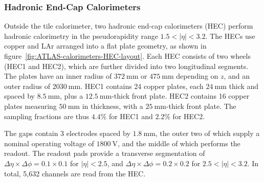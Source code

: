 \subsubsection{Hadronic End-Cap Calorimeters}\label{sec:ATLAS-calorimeters-HEC}
Outside the tile calorimeter, two hadronic end-cap calorimeters (HEC) perform hadronic calorimetry in the pseudorapidity range $1.5<|\eta|<3.2$. The HECs use copper and LAr arranged into a flat plate geometry, as shown in figure~\ref{fig:ATLAS-calorimeters-HEC-layout}. Each HEC consists of two wheels (HEC1 and HEC2), which are further divided into two longitudinal segments.  The plates have an inner radius of $\SI{372}{\milli\meter}$ or $\SI{475}{\milli\meter}$ depending on $z$, and an outer radius of $\SI{2030}{\milli\meter}$. HEC1 contains 24 copper plates, each $\SI{24}{\milli\meter}$ thick and spaced by $\SI{8.5}{\milli\meter}$, plus a $\SI{12.5}{\milli\meter}$-thick front plate. HEC2 contains 16 copper plates measuring $\SI{50}{\milli\meter}$ in thickness, with a $\SI{25}{\milli\meter}$-thick front plate. The sampling fractions are thus $4.4\%$ for HEC1 and $2.2\%$ for HEC2. 

The gaps contain 3 electrodes spaced by $\SI{1.8}{\milli\meter}$, the outer two of which supply a nominal operating voltage of $\SI{1800}{\volt}$, and the middle of which performs the readout. The readout pads provide a transverse segmentation of $\Delta\eta\times\Delta\phi=0.1\times0.1$ for $|\eta|<2.5$, and $\Delta\eta\times\Delta\phi=0.2\times0.2$ for $2.5<|\eta|<3.2$. In total, 5,632 channels are read from the HEC. 

